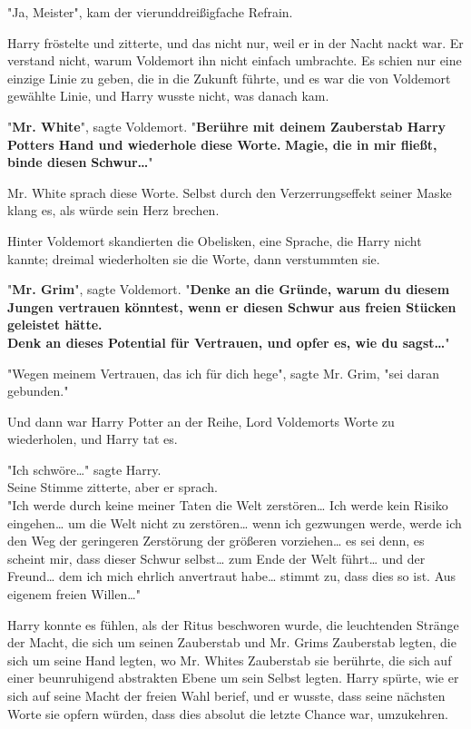 {"Ja, Meister", kam der vierunddreißigfache Refrain.

Harry fröstelte und zitterte, und das nicht nur, weil er in der Nacht nackt war. Er verstand nicht, warum Voldemort ihn nicht einfach umbrachte. Es schien nur eine einzige Linie zu geben, die in die Zukunft führte, und es war die von Voldemort gewählte Linie, und Harry wusste nicht, was danach kam.

"\textbf{Mr. White}", sagte Voldemort. "\textbf{Berühre mit deinem Zauberstab Harry Potters Hand und wiederhole diese Worte.} \textbf{Magie, die in mir fließt, binde diesen} \textbf{Schwur…}"

Mr. White sprach diese Worte. Selbst durch den Verzerrungseffekt seiner Maske klang es, als würde sein Herz brechen.

Hinter Voldemort skandierten die Obelisken, eine Sprache, die Harry nicht kannte; dreimal wiederholten sie die Worte, dann verstummten sie.

"\textbf{Mr. Grim}", sagte Voldemort. "\textbf{Denke an die Gründe, warum du diesem Jungen vertrauen könntest, wenn er diesen Schwur aus freien Stücken geleistet hätte.\\ Denk an dieses Potential für Vertrauen, und opfer es, wie du sagst…}"

"Wegen meinem Vertrauen, das ich für dich hege", sagte Mr. Grim, "sei daran gebunden."

Und dann war Harry Potter an der Reihe, Lord Voldemorts Worte zu wiederholen, und Harry tat es.

"Ich schwöre…" sagte Harry.\\ Seine Stimme zitterte, aber er sprach.\\ "Ich werde durch keine meiner Taten die Welt zerstören… Ich werde kein Risiko eingehen… um die Welt nicht zu zerstören… wenn ich gezwungen werde, werde ich den Weg der geringeren Zerstörung der größeren vorziehen… es sei denn, es scheint mir, dass dieser Schwur selbst… zum Ende der Welt führt… und der Freund… dem ich mich ehrlich anvertraut habe… stimmt zu, dass dies so ist. Aus eigenem freien Willen…"

Harry konnte es fühlen, als der Ritus beschworen wurde, die leuchtenden Stränge der Macht, die sich um seinen Zauberstab und Mr. Grims Zauberstab legten, die sich um seine Hand legten, wo Mr. Whites Zauberstab sie berührte, die sich auf einer beunruhigend abstrakten Ebene um sein Selbst legten. Harry spürte, wie er sich auf seine Macht der freien Wahl berief, und er wusste, dass seine nächsten Worte sie opfern würden, dass dies absolut die letzte Chance war, umzukehren.

}
